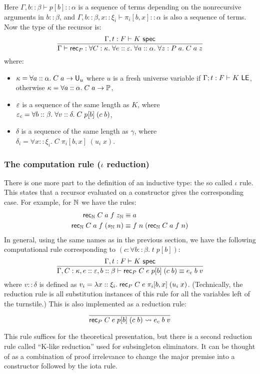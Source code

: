 Here $\Gamma,b::\beta\vdash p[b]::\alpha$ is a sequence of terms depending on the nonrecursive arguments in $b::\beta$, and $\Gamma,b::\beta,x::\xi_i\vdash \pi_i[b,x]::\alpha$ is also a sequence of terms. Now the type of the recursor is:
$$\frac{\Gamma,t:F\vdash K\spec}{\Gamma\vdash\rec_P:\forall C:\kappa.\;\forall e::\vep.\;\forall a::\alpha.\;\forall z:P\;a.\;C\;a\;z}$$
where:
\begin{itemize}
\item $\kappa=\forall a::\alpha.\;C\;a\to\U_u$ where $u$ is a fresh universe variable if $\Gamma;t:F\vdash K\LE$, otherwise $\kappa=\forall a::\alpha.\;C\;a\to\P$,
\item $\vep$ is a sequence of the same length as $K$, where $\vep_c=\forall b::\beta.\;\forall v::\delta.\;C\;p[b]\;(c\;b)$,
\item $\delta$ is a sequence of the same length as $\gamma$, where $\delta_i=\forall x::\xi_i.\;C\;\pi_i[b,x]\;(u_i\;x)$.
\end{itemize}

\subsubsection{The computation rule ($\iota$ reduction)}\label{sec:iota}

There is one more part to the definition of an inductive type: the so called $\iota$ rule. This states that a recursor evaluated on a constructor gives the corresponding case. For example, for $\N$ we have the rules:
%
\begin{align*}
\mathsf{rec}_\N\;C\;a\;f\;z_\N&\equiv a\\
\mathsf{rec}_\N\;C\;a\;f\;(s_\N\;n)&\equiv f\;n\;(\mathsf{rec}_\N\;C\;a\;f\;n)
\end{align*}
%
In general, using the same names as in the previous section, we have the following computational rule corresponding to $(c:\forall b::\beta.\;t\;p[b])$:
$$\frac{\Gamma,t:F\vdash K\spec}{\Gamma,C:\kappa,e::\vep,b::\beta\vdash\rec_P\;C\;e\;p[b]\;(c\;b)\equiv e_c\;b\;v}$$
where $v::\delta$ is defined as $v_i=\lambda x::\xi_i.\;\rec_P\;C\;e\;\pi_i[b,x]\;(u_i\;x)$. (Technically, the reduction rule is all substitution instances of this rule for all the variables left of the turnstile.) This is also implemented as a reduction rule:
$$\frac{}{\rec_P\;C\;e\;p[b]\;(c\;b)\rightsquigarrow e_c\;b\;v}$$

This rule suffices for the theoretical presentation, but there is a second reduction rule called ``K-like reduction'' used for subsingleton eliminators. It can be thought of as a combination of proof irrelevance to change the major premise into a constructor followed by the iota rule.

